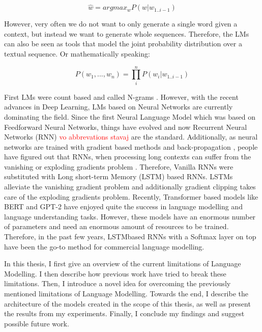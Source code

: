 \begin{displaymath}
    \hat{w} = argmax_w P(w | w_{1..i-1})
\end{displaymath}

However, very often we do not want to only generate a single word given a context, but instead we want to generate whole sequences. Therefore, the LMs can also be seen as tools that model the joint probability distribution over a textual sequence. Or mathematically speaking:

\begin{displaymath}
    P(w_1, ..., w_n) = \prod_i^n P(w_i | w_{1..i-1})
\end{displaymath}

First LMs were count based and called N-grams \citep{martin2009speech}. However, with the recent advances in Deep Learning, LMs based on Neural Networks are currently dominating the field. Since the first Neural Language Model \citep{bengio2003neural} which was based on Feedforward Neural Networks, things have evolved and now Recurrent Neural Networks (RNN) \citep{mikolov2010recurrent} \textcolor{red}{vo abbrevations stavaj} are the standard. Additionally, as neural networks are trained with gradient based methods and back-propagation \citep{rumelhart1988learning}, people have figured out that RNNs, when processing long contexts can suffer from the vanishing or exploding gradients problem \citep{hochreiter1998vanishing, pascanu2012understanding, pascanu2013difficulty}. Therefore, Vanilla RNNs were substituted with Long short-term Memory (LSTM) \citep{hochreiter1997long} based RNNs. LSTMs alleviate the vanishing gradient problem and additionally gradient clipping \citep{pascanu2013difficulty} takes care of the exploding gradients problem. Recently, Transformer \citep{vaswani2017attention} based models like BERT \citep{devlin2018bert} and GPT-2 \citep{radford2019language} have enjoyed quite the success in language modelling and language understanding tasks. However, these models have an enormous number of parameters and need an enormous amount of resources to be trained. Therefore, in the past few years, LSTM\osc{-}based RNNs with a Softmax layer on top have been the go-to method for commercial language modelling.


In this thesis, I first give an overview of the current limitations of Language Modelling. I then describe how previous work have tried to break these limitations. Then, I introduce a novel idea for overcoming the previously mentioned limitations of Language Modelling. Towards the end, I describe the architecture of the models created in the scope of this thesis, as well as present the results from my experiments. Finally, I conclude my findings and suggest possible future work.
